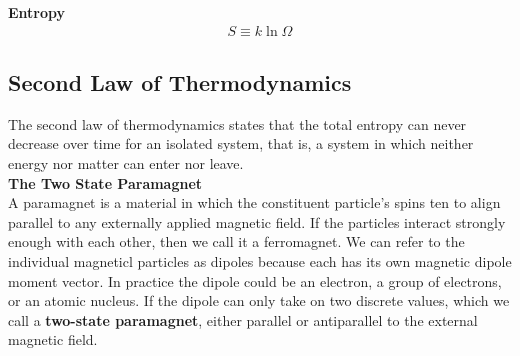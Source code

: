 \documentclass{article}
\begin{document}
\noindent \textbf{Entropy} \\

\begin{gather*}
    S \equiv k \ln{\Omega}
\end{gather*}


\subsection{Second Law of Thermodynamics} 
\indent The second law of thermodynamics states that the total entropy can never decrease over time for an isolated system, that is, a system in which neither energy nor matter can enter nor leave.
\\


\noindent \textbf{The Two State Paramagnet} \\
\indent A paramagnet is a material in which the constituent particle's spins ten to align parallel to any externally applied magnetic field. If the particles interact strongly enough with each other, then we call it a ferromagnet. We can refer to the individual magneticl particles as dipoles because each has its own magnetic dipole moment vector. In practice the dipole could be an electron, a group of electrons, or an atomic nucleus. If the dipole can only take on two discrete values, which we call a \textbf{two-state paramagnet}, either parallel or antiparallel to the external magnetic field.
\end{document}

